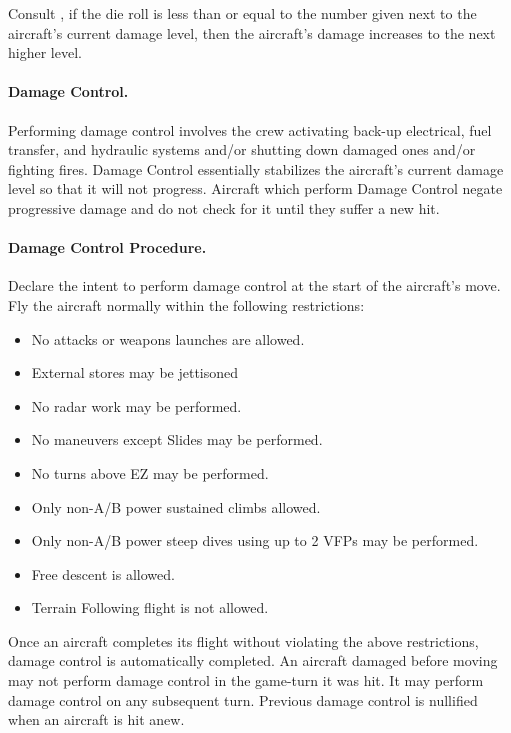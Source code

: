 Consult , if the die roll is less than or equal to the number given next to the aircraft's current damage level, then the aircraft's damage increases to the next higher level.

\paragraph{Damage Control.} Performing damage control involves the crew activating back-up electrical, fuel transfer, and hydraulic systems and/or shutting down damaged ones and/or fighting fires. Damage Control essentially stabilizes the aircraft's current damage level so that it will not progress. Aircraft which perform Damage Control negate progressive damage and do not check for it until they suffer a new hit.

\paragraph{Damage Control Procedure.} Declare the intent to perform damage control at the start of the aircraft's move. Fly the aircraft normally within the following restrictions:

\begin{itemize}
    \item No attacks or weapons launches are allowed.
    \item External stores may be jettisoned
    \item No radar work may be performed.
    \item No maneuvers except Slides may be performed.
    \item No turns above EZ may be performed.
    \item Only non-A/B power sustained climbs allowed.
    \item Only non-A/B power steep dives using up to 2 VFPs may be performed.
    \item Free descent is allowed.
    \item Terrain Following flight is not allowed.
\end{itemize}

Once an aircraft completes its flight without violating the above restrictions, damage control is automatically completed. An aircraft damaged before moving may not perform damage control in the game-turn it was hit. It may perform damage control on any subsequent turn. Previous damage control is nullified when an aircraft is hit anew.

